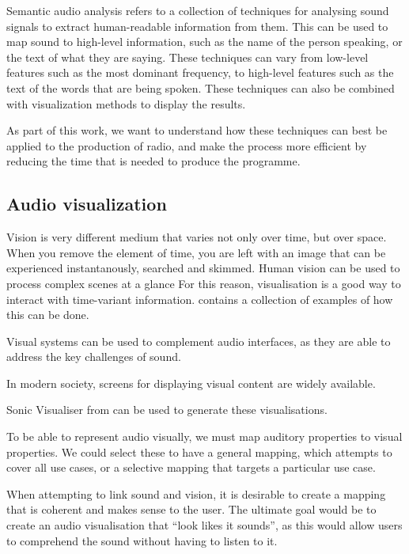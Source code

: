 Semantic audio analysis refers to a collection of techniques for analysing sound signals to extract human-readable
information from them. This can be used to map sound to high-level information, such as the name of the person
speaking, or the text of what they are saying. These techniques can vary from low-level features such as the most
dominant frequency, to high-level features such as the text of the words that are being spoken. These techniques can
also be combined with visualization methods to display the results.

As part of this work, we want
to understand how these techniques can best be applied to the production of radio, and make the process more efficient
by reducing the time that is needed to produce the programme. 

\subsection{Audio visualization}

Vision is very different medium that varies not only over time, but over space. When you remove the element of time,
you are left with an image that can be experienced instantanously, searched and skimmed.  Human vision can be used to
process complex scenes at a glance
For this reason, visualisation is a good way to interact with time-variant information.  \citet{Aigner2011} contains a
collection of examples of how this can be done.

Visual systems can be used to complement audio interfaces, as they are able to address the key challenges of sound.

In modern society, screens for displaying visual content are widely available.

Sonic Visualiser from \citet{Cannam2010} can be used to generate these visualisations.

To be able to represent audio visually, we must map auditory properties to visual properties. We could select these 
to have a general mapping, which attempts to cover all use cases, or a selective mapping that targets a particular use
case.

When attempting to link sound and vision, it is desirable to create a mapping that is coherent and makes sense to the
user. The ultimate goal would be to create an audio visualisation that ``look likes it sounds'', as this would
allow users to comprehend the sound without having to listen to it.

